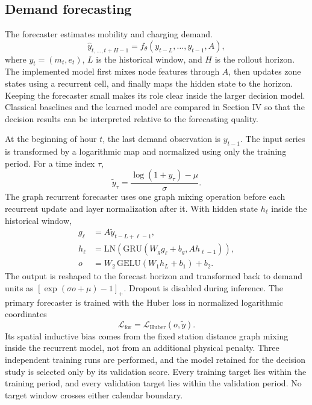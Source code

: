 \documentclass[journal]{IEEEtran}
\begin{document}
\subsection{Demand forecasting}
\label{sec:forecast}

The forecaster estimates mobility and charging demand.
\begin{equation}
\hat y_{t,\ldots,t+H-1}=f_{\theta}(y_{t-L},\ldots,y_{t-1},A),
\end{equation}
where $y_t=(m_t,e_t)$, $L$ is the historical window, and $H$ is the rollout
horizon.  The implemented model first mixes node features through $A$, then
updates zone states using a recurrent cell, and finally maps the hidden state to
the horizon.  Keeping the forecaster small makes its role clear inside the
larger decision model.  Classical baselines and the learned model are compared
in Section IV so that the decision results can be interpreted relative to the
forecasting quality.

At the beginning of hour $t$, the last demand observation is $y_{t-1}$.
The input series is transformed by a logarithmic map and normalized using only
the training period.  For a time index $\tau$,
\begin{equation}
\tilde y_{\tau}=
\frac{\log(1+y_{\tau})-\mu}{\sigma}.
\end{equation}
The graph recurrent forecaster uses one graph mixing operation before each
recurrent update and layer normalization after it.  With hidden state
$h_{\ell}$ inside the historical window,
\begin{align}
g_{\ell} &= A\tilde y_{t-L+\ell-1},\\
h_{\ell} &= \mathrm{LN}(\mathrm{GRU}(W_g g_{\ell}+b_g,Ah_{\ell-1})),\\
o &= W_2\,\mathrm{GELU}(W_1h_L+b_1)+b_2.
\end{align}
The output is reshaped to the forecast horizon and transformed back to demand
units as $[\exp(\sigma o+\mu)-1]_+$.  Dropout is disabled during inference.  The
primary forecaster is trained with the Huber loss in normalized logarithmic
coordinates
\begin{equation}
\mathcal{L}_{\mathrm{for}}=\mathcal{L}_{\mathrm{Huber}}(o,\tilde y).
\end{equation}
Its spatial inductive bias comes from the fixed station distance graph mixing
inside the recurrent model, not from an additional physical penalty.
Three independent training runs are performed, and the model retained for the
decision study is selected only by its validation score.  Every training target
lies within the training period, and every validation target lies within the
validation period.  No target window crosses either calendar boundary.
\end{document}

